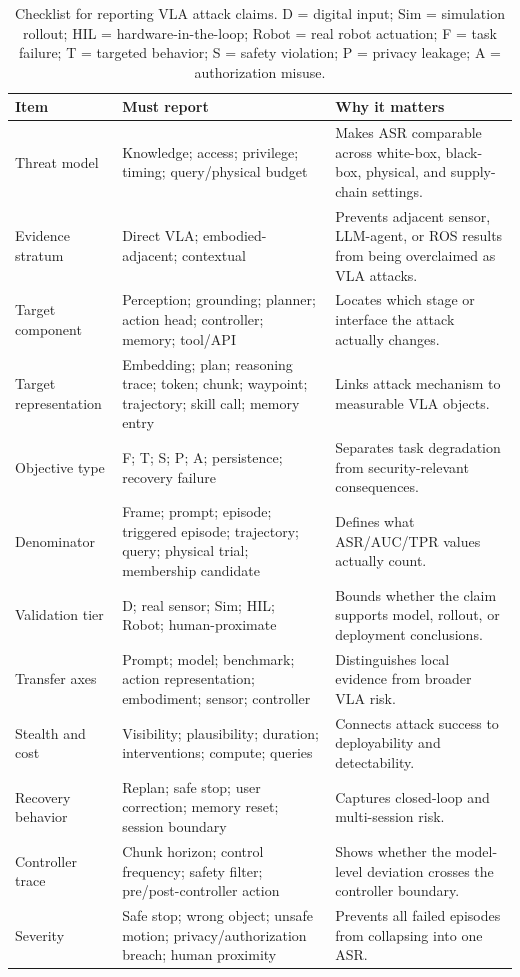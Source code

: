 \begin{table}[t]
\centering
\scriptsize
\caption{Checklist for reporting VLA attack claims. D = digital input; Sim = simulation rollout; HIL = hardware-in-the-loop; Robot = real robot actuation; F = task failure; T = targeted behavior; S = safety violation; P = privacy leakage; A = authorization misuse.}
\label{tab:attack-reporting}
\renewcommand{\arraystretch}{1.08}
\setlength{\tabcolsep}{3pt}
\begin{tabularx}{\textwidth}{@{}P{0.18\textwidth}Y Y@{}}
\toprule
\textbf{Item} & \textbf{Must report} & \textbf{Why it matters} \\
\midrule
Threat model & Knowledge; access; privilege; timing; query/physical budget & Makes ASR comparable across white-box, black-box, physical, and supply-chain settings. \\
Evidence stratum & Direct VLA; embodied-adjacent; contextual & Prevents adjacent sensor, LLM-agent, or ROS results from being overclaimed as VLA attacks. \\
Target component & Perception; grounding; planner; action head; controller; memory; tool/API & Locates which stage or interface the attack actually changes. \\
Target representation & Embedding; plan; reasoning trace; token; chunk; waypoint; trajectory; skill call; memory entry & Links attack mechanism to measurable VLA objects. \\
Objective type & F; T; S; P; A; persistence; recovery failure & Separates task degradation from security-relevant consequences. \\
Denominator & Frame; prompt; episode; triggered episode; trajectory; query; physical trial; membership candidate & Defines what ASR/AUC/TPR values actually count. \\
Validation tier & D; real sensor; Sim; HIL; Robot; human-proximate & Bounds whether the claim supports model, rollout, or deployment conclusions. \\
Transfer axes & Prompt; model; benchmark; action representation; embodiment; sensor; controller & Distinguishes local evidence from broader VLA risk. \\
Stealth and cost & Visibility; plausibility; duration; interventions; compute; queries & Connects attack success to deployability and detectability. \\
Recovery behavior & Replan; safe stop; user correction; memory reset; session boundary & Captures closed-loop and multi-session risk. \\
Controller trace & Chunk horizon; control frequency; safety filter; pre/post-controller action & Shows whether the model-level deviation crosses the controller boundary. \\
Severity & Safe stop; wrong object; unsafe motion; privacy/authorization breach; human proximity & Prevents all failed episodes from collapsing into one ASR. \\
\bottomrule
\end{tabularx}
\end{table}
